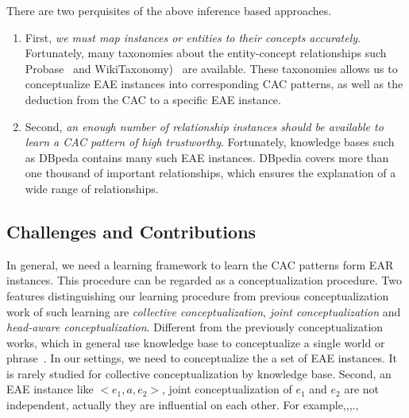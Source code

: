 There are two perquisites of the above inference based approaches.
\begin{enumerate}
\item First, {\it we must map instances or entities to their concepts accurately}. Fortunately, many taxonomies about the entity-concept relationships such \ac{Probase}~\cite{wu2012probase} and \ac{WikiTaxonomy})~\cite{ponzetto2007deriving} are available. These taxonomies allows us to conceptualize EAE instances into corresponding CAC patterns, as well as the deduction from the CAC to a specific EAE instance.
\item Second, {\it an enough number of relationship instances should be available to learn a CAC pattern of high trustworthy}. Fortunately, knowledge bases such as \ac{DBpeda} contains many such EAE instances. DBpedia covers more than one thousand of important relationships, which ensures the explanation of a wide range of relationships.
\end{enumerate}




\subsection{Challenges and Contributions}

In general, we need a learning framework to learn the CAC patterns form EAR instances.
This procedure can be regarded as a conceptualization procedure.
Two features distinguishing our learning procedure from previous conceptualization work of such learning are {\it collective conceptualization}, {\it joint conceptualization} and {\it head-aware conceptualization}.
Different from the previously conceptualization works, which in general use knowledge base to conceptualize a single world or phrase~\cite{song2011short,kim2013context}.
In our settings, we need to conceptualize the a set of EAE instances. It is rarely studied for collective conceptualization by knowledge base.
Second, an EAE instance like $<e_1, a, e_2>$, joint conceptualization of $e_1$ and $e_2$ are not independent, actually they are influential on each other. For example,,,.,

